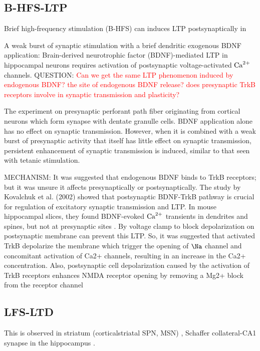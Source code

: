 \subsection{B-HFS-LTP}
\label{sec:bHFS-LTP}

Brief high-frequency stimulation (B-HFS) can induces LTP postsynaptically in

A weak burst of synaptic stimulation with a brief dendritic exogenous
  BDNF application: Brain-derived neurotrophic factor (BDNF)-mediated LTP in
  hippocampal neurons requires activation of postsynaptic voltage-activated
  ${\text{Ca}^{2+}}$ channels. QUESTION: \textcolor{red}{Can we get the same LTP phenomenon
  induced by endogenous BDNF? the site of endogenous BDNF release? does
  presynaptic TrkB receptors involve in synaptic transmission and plasticity?}
  
  The experiment on presynaptic perforant path fiber originating from cortical
  neurons which form synapse with dentate granulle cells.
  BDNF application alone has no effect on synaptic transmission. However, when
  it is combined with a weak burst of presynaptic activity that itself has
  little effect on synaptic transmission, persistent enhancement of synaptic
  transmission is induced, similar to that seen with tetanic stimulation.
  


MECHANISM: It was suggested that  endogenous BDNF binds to TrkB receptors; but
it was unsure it affects presynaptically or postsynaptically. The study by
Kovalchuk et al. (2002) showed that postsynaptic BDNF-TrkB pathway is crucial
for regulation of excitatory synaptic transmission and LTP.
In mouse hippocampal slices, they found BDNF-evoked ${\text{Ca}^{2+}}$ transients in
dendrites and spines, but not at presynaptic sites \citep{kovalchuk2002}.
By voltage clamp to block depolarization on postsynaptic membrane can prevent
this LTP.
So, it was suggested that activated TrkB depolarize the membrane which trigger
the opening of $\Na$ channel and concomitant activation of Ca2+ channels,
resulting in an increase in the Ca2+ concentration.
Also, postsynaptic cell depolarization caused by the activation of TrkB
receptors enhances NMDA receptor opening by removing a Mg2+ block from the
receptor channel

\subsection{LFS-LTD}
\label{sec:LFS-LTD}

This is observed in striatum (corticalstriatal SPN, MSN) \citep{fino2005},
Schaffer collateral-CA1 synapse in the hippocampus \citep{dudek1992, dudek1993}.

